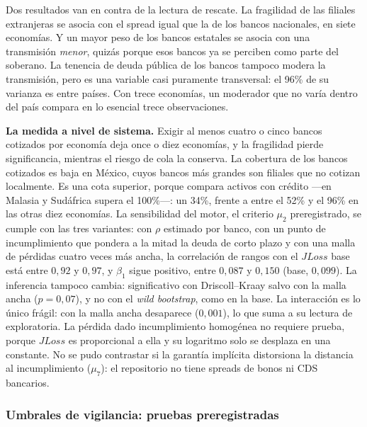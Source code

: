 Dos resultados van en contra de la lectura de rescate. La fragilidad de las filiales extranjeras se asocia con el spread igual que la de los bancos nacionales, en siete economías. Y un mayor peso de los bancos estatales se asocia con una transmisión \emph{menor}, quizás porque esos bancos ya se perciben como parte del soberano. La tenencia de deuda pública de los bancos tampoco modera la transmisión, pero es una variable casi puramente transversal: el 96\% de su varianza es entre países. Con trece economías, un moderador que no varía dentro del país compara en lo esencial trece observaciones.

\textbf{La medida a nivel de sistema.} Exigir al menos cuatro o cinco bancos cotizados por economía deja once o diez economías, y la fragilidad pierde significancia, mientras el riesgo de cola la conserva. La cobertura de los bancos cotizados es baja en México, cuyos bancos más grandes son filiales que no cotizan localmente. Es una cota superior, porque compara activos con crédito ---en Malasia y Sudáfrica supera el 100\%---: un 34\%, frente a entre el 52\% y el 96\% en las otras diez economías. La sensibilidad del motor, el criterio $\mu_{2}$ preregistrado, se cumple con las tres variantes: con $\rho$ estimado por banco, con un punto de incumplimiento que pondera a la mitad la deuda de corto plazo y con una malla de pérdidas cuatro veces más ancha, la correlación de rangos con el $JLoss$ base está entre $0{,}92$ y $0{,}97$, y $\beta_1$ sigue positivo, entre $0{,}087$ y $0{,}150$ (base, $0{,}099$). La inferencia tampoco cambia: significativo con Driscoll--Kraay salvo con la malla ancha ($p=0{,}07$), y no con el \textit{wild bootstrap}, como en la base. La interacción es lo único frágil: con la malla ancha desaparece ($0{,}001$), lo que suma a su lectura de exploratoria. La pérdida dado incumplimiento homogénea no requiere prueba, porque $JLoss$ es proporcional a ella y su logaritmo solo se desplaza en una constante. No se pudo contrastar si la garantía implícita distorsiona la distancia al incumplimiento ($\mu_{7}$): el repositorio no tiene spreads de bonos ni CDS bancarios.

\subsubsection{Umbrales de vigilancia: pruebas preregistradas}
\label{sec:umbrales-prereg}

